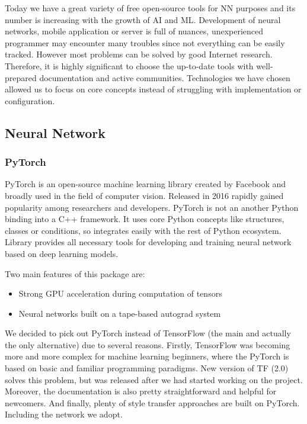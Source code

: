 \documentclass[../Main.tex]{subfiles}
\begin{document}
Today we have a great variety of free open-source tools for NN purposes and its number is increasing with the growth of AI and ML. Development of neural networks, mobile application or server is full of nuances, unexperienced programmer may encounter many troubles since not everything can be easily tracked. However most problems can be solved by good Internet research. Therefore, it is highly significant to choose the up-to-date tools with well-prepared documentation and active communities. Technologies we have chosen allowed us to focus on core concepts instead of struggling with implementation or configuration.

\subsection{Neural Network}

    \subsubsection{PyTorch}
        PyTorch is an open-source machine learning library created by Facebook and broadly used in the field of computer vision. Released in 2016 rapidly gained popularity among researchers and developers. PyTorch is not an another Python binding into a C++ framework. It uses core Python concepts like structures, classes or conditions, so integrates easily with the rest of Python ecosystem. Library provides all necessary tools for developing and training neural network based on deep learning models.
        
        Two main features of this package are:
        \begin{itemize}
            \item Strong GPU acceleration during computation of tensors
            \item Neural networks built on a tape-based autograd system
        \end{itemize}
        
        We decided to pick out PyTorch instead of TensorFlow (the main and actually the only alternative) due to several reasons. Firstly, TensorFlow was becoming more and more complex for machine learning beginners, where the PyTorch is based on basic and familiar programming paradigms. New version of TF (2.0) solves this problem, but was released after we had started working on the project. Moreover, the documentation is also pretty straightforward and helpful for newcomers. And finally, plenty of style transfer approaches are built on PyTorch. Including the network we adopt. 
        
\end{document}
